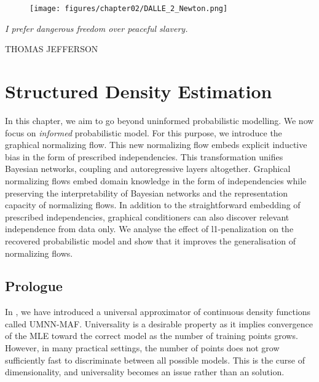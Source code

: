 
\begin{figure}[h]
  \centering

  \texttt{[image: figures/chapter02/DALLE\_2\_Newton.png]}
  \label{}
\end{figure}

\vfill

{
\textit{\justify
   I prefer dangerous freedom over peaceful slavery.}

  \par\bigskip
  \raggedleft\MakeUppercase{Thomas Jefferson}
  \par%
}

\chapter{Structured Density Estimation}\label{ch:06}

\begin{chapter_outline}
  In this chapter, we aim to go beyond uninformed probabilistic modelling. We now focus on \textit{informed} probabilistic model.
  For this purpose, we introduce the graphical normalizing flow. This new normalizing flow embeds explicit inductive bias in the form of prescribed independencies. This transformation unifies Bayesian networks, coupling and autoregressive layers altogether. Graphical normalizing flows embed domain knowledge in the form of independencies while preserving the interpretability of Bayesian networks and the representation capacity of normalizing flows. In addition to the straightforward embedding of prescribed independencies, graphical conditioners can also discover relevant independence from data only. We analyse the effect of l1-penalization on the recovered probabilistic model and show that it improves the generalisation of normalizing flows.
\end{chapter_outline}

\section{Prologue}
In , we have introduced a universal approximator of continuous density functions called UMNN-MAF. Universality is a desirable property as it implies convergence of the MLE toward the correct model as the number of training points grows. However, in many practical settings, the number of points does not grow sufficiently fast to discriminate between all possible models. This is the curse of dimensionality, and universality becomes an issue rather than an solution.

